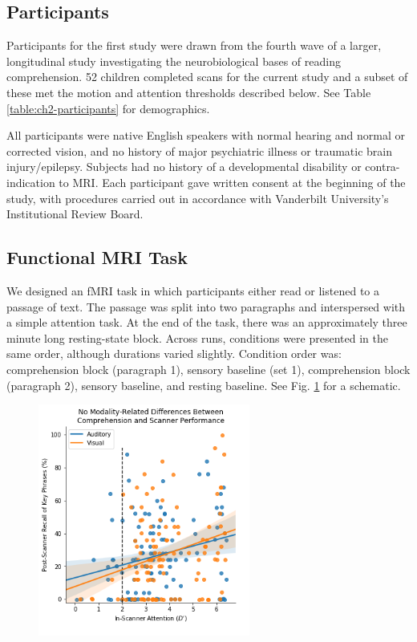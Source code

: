 \subsection{Participants}

Participants for the first study were drawn from the fourth wave of a larger, longitudinal study investigating the neurobiological bases of reading comprehension. 52 children completed scans for the current study and a subset of these met the motion and attention thresholds described below. See Table \ref{table:ch2-participants} for demographics. 

All participants were native English speakers with normal hearing and normal or corrected vision, and no history of major psychiatric illness or traumatic brain injury/epilepsy. Subjects had no history of a developmental disability or contra-indication to MRI.  Each participant gave written consent at the beginning of the study, with procedures carried out in accordance with Vanderbilt University’s Institutional Review Board.

\begin{table}
	\renewcommand{\tabcolsep}{0.09cm}
	\centering
	
	\caption[Participant demographics for Study 1.]
	\label{table:ch2-participants}
\end{table}

\subsection{Functional MRI Task}

We designed an fMRI task in which participants either read or listened to a passage of text. The passage was split into two paragraphs and interspersed with a simple attention task. At the end of the task, there was an approximately three minute long resting-state block. Across runs, conditions were presented in the same order, although durations varied slightly. Condition order was: comprehension block (paragraph 1), sensory baseline (set 1), comprehension block (paragraph 2), sensory baseline, and resting baseline. See Fig. \ref{fig:ch2-task-design} for a schematic.

\begin{figure}[t]
	\centering
	\includegraphics[height=3in]{images/ch2-eprime-recall.png}
	\caption[Schematic of the reading comprehension task.]
	\label{fig:ch2-task-design}
\end{figure}

